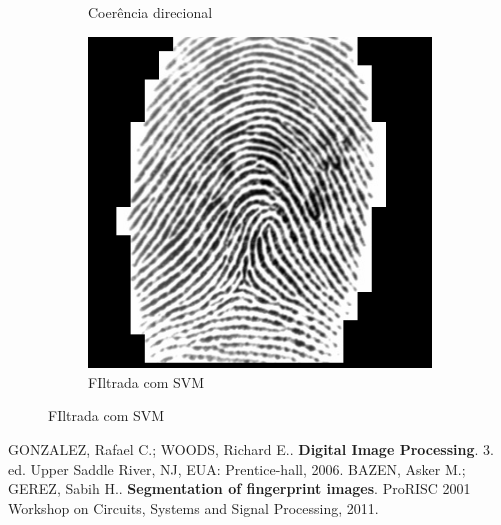 \documentclass[10pt,a4paper]{article}
\begin{document}
\begin{figure}[!ht]
\begin{subfigure}[ht]{0.25\textwidth}
        \caption{Coerência direcional}
    \end{subfigure}
    \begin{subfigure}[ht]{0.25\textwidth}
        \includegraphics[width=\textwidth]{Fingerprints/1_1_filtered.jpg}
        \caption{FIltrada com SVM}
    \end{subfigure}
\end{figure}

\begin{thebibliography}{99}
     GONZALEZ, Rafael C.; WOODS, Richard E.. \textbf{Digital Image Processing}. 3. ed. Upper Saddle River, NJ, EUA: Prentice-hall, 2006.
     BAZEN, Asker M.; GEREZ, Sabih H.. \textbf{Segmentation of fingerprint images}. ProRISC 2001 Workshop on Circuits, Systems and Signal Processing, 2011.
    
\end{thebibliography}
\end{document}
